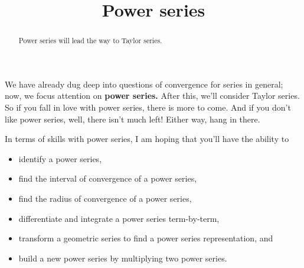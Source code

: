 \documentclass{ximera}
\title{Power series}
\begin{document}
\begin{abstract}
  Power series will lead the way to Taylor series.
\end{abstract}

\maketitle

We have already dug deep into questions of convergence for series in
general; now, we focus attention on \textbf{power series.}  After
this, we'll consider Taylor series.  So if you fall in love with power
series, there is more to come.  And if you don't like power series,
well, there isn't much left!  Either way, hang in there.

In terms of skills with power series, I am hoping that you'll have the ability to
\begin{itemize}
\item identify a power series,
\item find the interval of convergence of a power series,
\item find the radius of convergence of a power series,
\item differentiate and integrate a power series term-by-term,
\item transform a geometric series to find a power series representation, and
\item build a new power series by multiplying two power series.
\end{itemize}
\end{document}
